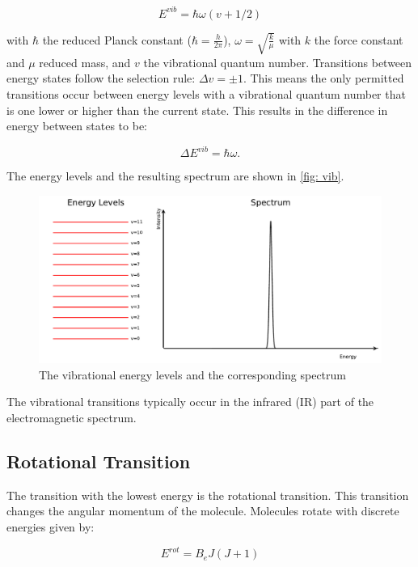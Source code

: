 \documentclass[twoside, single, authoryear, semicolon, 12pt]{lion-msc}
\newcommand{\4}{$_4$}
\newcommand{\3}{$_3$}
\newcommand{\2}{$_2$}
\begin{document}
\begin{equation}
    E^{vib}=\hbar\omega(v+1/2)
\end{equation}

with $\hbar$ the reduced Planck constant ($\hbar=\frac{h}{2\pi}$), $\omega=\sqrt{\frac{k}{\mu}}$ with $k$ the force constant and $\mu$ reduced mass, and $v$ the vibrational quantum number. Transitions between energy states follow the selection rule: $\Delta v=\pm 1$. This means the only permitted transitions occur between energy levels with a vibrational quantum number that is one lower or higher than the current state. This results in the difference in energy between states to be:

\begin{equation}
    \Delta E^{vib}=\hbar\omega.
\end{equation}

The energy levels and the resulting spectrum are shown in \autoref{fig: vib}.

\begin{figure}[H]
    \centering
    \includegraphics[width=\linewidth]{Figures/VibSpectrum.pdf}
    \caption{The vibrational energy levels and the corresponding spectrum}
    \label{fig: vib}
\end{figure}

The vibrational transitions typically occur in the infrared (IR) part of the electromagnetic spectrum. 


\subsection{Rotational Transition}
The transition with the lowest energy is the rotational transition. This transition changes the angular momentum of the molecule. Molecules rotate with discrete energies given by:

\begin{equation}
    E^{rot}=B_eJ(J+1)
\end{equation}
\end{document}
